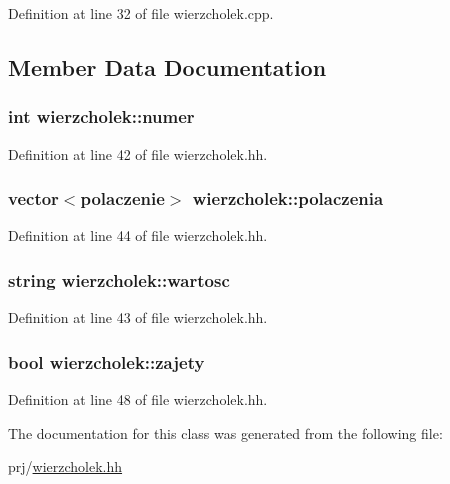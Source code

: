 \-Definition at line 32 of file wierzcholek.\-cpp.



\subsection{\-Member \-Data \-Documentation}
\hypertarget{classwierzcholek_a66aaea6b1187250f7100542adc1617d2}{
\subsubsection[{numer}]{\setlength{\rightskip}{0pt plus 5cm}int {\bf wierzcholek\-::numer}}}\label{classwierzcholek_a66aaea6b1187250f7100542adc1617d2}


\-Definition at line 42 of file wierzcholek.\-hh.

\hypertarget{classwierzcholek_ad6442177753c61769b0fa1822e75f551}{
\subsubsection[{polaczenia}]{\setlength{\rightskip}{0pt plus 5cm}vector$<${\bf polaczenie}$>$ {\bf wierzcholek\-::polaczenia}}}\label{classwierzcholek_ad6442177753c61769b0fa1822e75f551}


\-Definition at line 44 of file wierzcholek.\-hh.

\hypertarget{classwierzcholek_a19aa16bf7e01a987fcc360e5da902209}{
\subsubsection[{wartosc}]{\setlength{\rightskip}{0pt plus 5cm}string {\bf wierzcholek\-::wartosc}}}\label{classwierzcholek_a19aa16bf7e01a987fcc360e5da902209}


\-Definition at line 43 of file wierzcholek.\-hh.

\hypertarget{classwierzcholek_ad67644b5f408397f28d7150d3bac76d2}{
\subsubsection[{zajety}]{\setlength{\rightskip}{0pt plus 5cm}bool {\bf wierzcholek\-::zajety}}}\label{classwierzcholek_ad67644b5f408397f28d7150d3bac76d2}


\-Definition at line 48 of file wierzcholek.\-hh.



\-The documentation for this class was generated from the following file\-:\begin{DoxyCompactItemize}
\item 
prj/\hyperlink{wierzcholek_8hh}{wierzcholek.\-hh}\end{DoxyCompactItemize}

